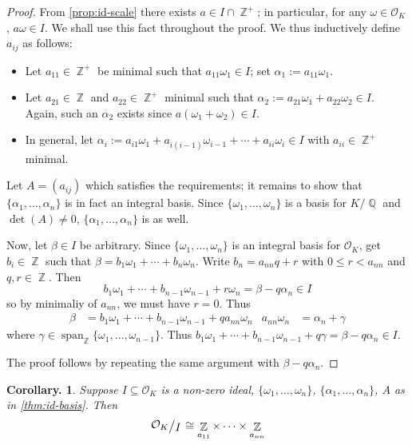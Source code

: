 \documentclass[11pt, a4paper]{memoir}
\DeclareMathOperator{\Q}{{\mathbb{Q}}}
\DeclareMathOperator{\Z}{{\mathbb{Z}}}
\theoremstyle{change}
\newtheorem{corollary}[theorem]{Corollary.}
\theoremstyle{plain}
\theoremstyle{nonumberplain}
\newtheorem{proof}{Proof}
\DeclareMathOperator{\spn}{span}
\newcommand{\quot}[2]{\mathchoice{\left.\raisebox{0.13em}{$#1$}\middle/\raisebox{-0.13em}{$#2$}\right.}
                                 {\left.\raisebox{0.07em}{$#1$}\middle/\raisebox{-0.07em}{$#2$}\right.}
                                 {\left.\raisebox{0.03em}{$#1$}\middle/\raisebox{-0.03em}{$#2$}\right.}
                                 {\left.\raisebox{0em}{$#1$}\middle/\raisebox{0em}{$#2$}\right.}}
\numberwithin{equation}{section}
\begin{document}
\begin{proof}
    From \cref{prop:id-scale} there exists $a\in I\cap\Z^+$; in particular, for any $\omega\in\mathcal{O}_K$, $a\omega\in I$.
    We shall use this fact throughout the proof.
    We thus inductively define $a_{ij}$ as follows:
    \begin{itemize}[nl]
        \item Let $a_{11}\in\Z^+$ be minimal such that $a_{11}\omega_1\in I$; set $\alpha_1:=a_{11}\omega_1$.
        \item Let $a_{21}\in\Z$ and $a_{22}\in\Z^+$ minimal such that $\alpha_2:=a_{21}\omega_1+a_{22}\omega_2\in I$.
            Again, such an $\alpha_2$ exists since $a(\omega_1+\omega_2)\in I$.
        \item In general, let $\alpha_i:=a_{i1}\omega_1+a_{i(i-1)}\omega_{i-1}+\cdots+a_{ii}\omega_i\in I$ with $a_{ii}\in\Z^+$ minimal.
    \end{itemize}
    Let $A=(a_{ij})$ which satisfies the requirements; it remains to show that $\{\alpha_1,\ldots,\alpha_n\}$ is in fact an integral basis.
    Since $\{\omega_1,\ldots,\omega_n\}$ is a basis for $K/\Q$ and $\det(A)\neq 0$, $\{\alpha_1,\ldots,\alpha_n\}$ is as well.

    Now, let $\beta\in I$ be arbitrary.
    Since $\{\omega_1,\ldots,\omega_n\}$ is an integral basis for $\mathcal{O}_K$, get $b_i\in\Z$ such that $\beta=b_1\omega_1+\cdots+b_n\omega_n$.
    Write $b_n=a_{nn}q+r$ with $0\leq r<a_{nn}$ and $q,r\in\Z$.
    Then
    \begin{equation*}
        b_1\omega_1+\cdots+b_{n-1}\omega_{n-1}+r\omega_n=\beta-q\alpha_n\in I
    \end{equation*}
    so by minimaliy of $a_{nn}$, we must have $r=0$.
    Thus
    \begin{align*}
        \beta&=b_1\omega_1+\cdots+b_{n-1}\omega_{n-1}+qa_{nn}\omega_n & a_{nn}\omega_n&=\alpha_n+\gamma
    \end{align*}
    where $\gamma\in\spn_{\Z}\{\omega_1,\ldots,\omega_{n-1}\}$.
    Thus $b_1\omega_1+\cdots+b_{n-1}\omega_{n-1}+q\gamma=\beta-q\alpha_n\in I$.

    The proof follows by repeating the same argument with $\beta-q\alpha_n$.
\end{proof}
\begin{corollary}
    Suppose $I\subseteq\mathcal{O}_K$ is a non-zero ideal, $\{\omega_1,\ldots,\omega_n\}$, $\{\alpha_1,\ldots,\alpha_n\}$, $A$ as in \cref{thm:id-basis}.
    Then
    \begin{equation*}
        \quot{\mathcal{O}_K}{I}\cong \Z_{a_{11}}\times\cdots\times\Z_{a_{nn}}
    \end{equation*}
\end{corollary}
\end{document}
